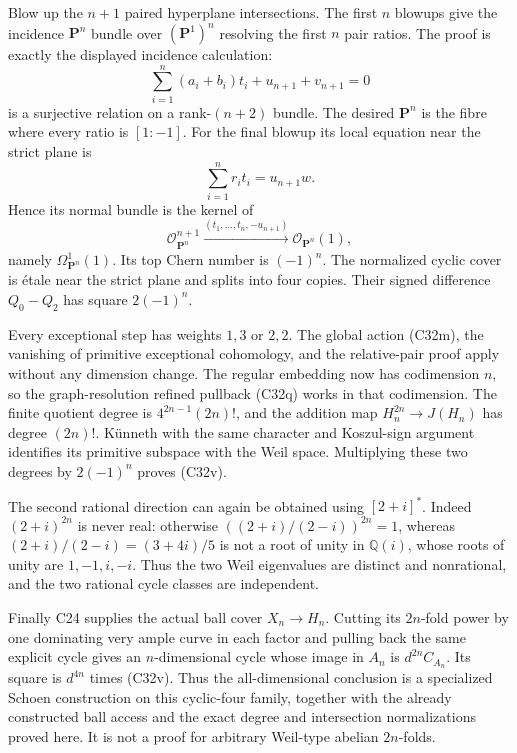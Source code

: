 \documentclass[11pt]{article}
\newcommand{\Q}{\mathbb Q}\newcommand{\C}{\mathbb C}\newcommand{\Z}{\mathbb Z}\newcommand{\R}{\mathbb R}\newcommand{\A}{\mathbb A}\newcommand{\OO}{\mathcal O}
\theoremstyle{definition}\newtheorem{definition}[theorem]{Definition}\newtheorem{remark}[theorem]{Remark}
\begin{document}
Blow up the $n+1$ paired hyperplane
intersections.  The first $n$ blowups give
the incidence $\mathbf P^n$ bundle over
$(\mathbf P^1)^n$ resolving the first
$n$ pair ratios.  The proof is exactly
the displayed incidence calculation:
\[
       \sum_{i=1}^{n}(a_i+b_i)t_i+u_{n+1}+v_{n+1}=0
\]
is a surjective relation on a rank-$(n+2)$
bundle.  The desired $\mathbf P^n$ is
the fibre where every ratio is $[1:-1]$.
For the final blowup its local equation
near the strict plane is
\[
                  \sum_{i=1}^{n}r_it_i=u_{n+1}w.
\]
Hence its normal bundle is the kernel of
\[
       \mathcal O_{\mathbf P^n}^{n+1}
        \xrightarrow{(t_1,\ldots,t_n,-u_{n+1})}
                          \mathcal O_{\mathbf P^n}(1),
\]
namely $\Omega^1_{\mathbf P^n}(1)$.  Its
top Chern number is $(-1)^n$.
The normalized cyclic cover is \'etale near
the strict plane and splits into four
copies.  Their signed difference $Q_0-Q_2$
has square $2(-1)^n$.

Every exceptional step has weights $1,3$
or $2,2$.  The global action (C32m), the
vanishing of primitive exceptional
cohomology, and the relative-pair proof
apply without any dimension change.
The regular embedding now has codimension
$n$, so the graph-resolution refined
pullback (C32q) works in that codimension.
The finite quotient degree is
$4^{2n-1}(2n)!$, and the addition map
$H_n^{2n}\to J(H_n)$ has degree $(2n)!$.
K\"unneth with the same character and
Koszul-sign argument identifies its
primitive subspace with the Weil space.
Multiplying these two degrees by
$2(-1)^n$ proves (C32v).

The second rational direction can again
be obtained using $[2+i]^*$.  Indeed
$(2+i)^{2n}$ is never real: otherwise
$((2+i)/(2-i))^{2n}=1$, whereas
$(2+i)/(2-i)=(3+4i)/5$ is not a root
of unity in $\Q(i)$, whose roots of
unity are $1,-1,i,-i$.  Thus the two
Weil eigenvalues are distinct and
nonrational, and the two rational
cycle classes are independent.

Finally C24 supplies the actual ball
cover $X_n\to H_n$.  Cutting its
$2n$-fold power by one dominating
very ample curve in each factor and
pulling back the same explicit cycle
gives an $n$-dimensional cycle whose
image in $A_n$ is $d^{2n}C_{A_n}$.
Its square is $d^{4n}$ times (C32v).
Thus the all-dimensional conclusion
is a specialized Schoen construction
on this cyclic-four family, together
with the already constructed ball
access and the exact degree and
intersection normalizations proved
here.  It is not a proof for arbitrary
Weil-type abelian $2n$-folds.
\end{document}

